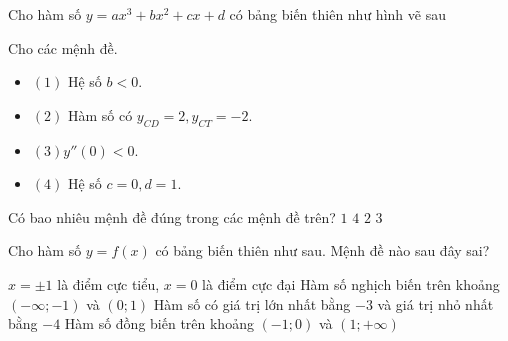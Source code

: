 \begin{ex}%
	Cho hàm số $y=ax^3+bx^2+cx+d$ có bảng biến thiên như hình vẽ sau
	\begin{center}
	\end{center}
	Cho các mệnh đề.
	\begin{itemize}
		\item $(1)$ Hệ số $b<0$.
		\item $(2)$ Hàm số có $y_{CD}=2,y_{CT}=-2$.
		\item $(3) y''(0)<0$.
		\item $(4)$ Hệ số $c=0,d=1$.
	\end{itemize}
	Có bao nhiêu mệnh đề đúng trong các mệnh đề trên?
	\choice
	{$1$}
	{$4$}
	{$2$}
	{\True $3$}
\end{ex}
\begin{ex}%
	Cho hàm số $y=f(x)$ có bảng biến thiên như sau. Mệnh đề nào sau đây sai?
	\begin{center}
	\end{center}
	\choice
	{$x=\pm 1$ là điểm cực tiểu, $x=0$ là điểm cực đại}
	{Hàm số nghịch biến trên khoảng $(-\infty;-1)$ và $(0;1)$}
	{\True Hàm số có giá trị lớn nhất bằng $-3$ và giá trị nhỏ nhất bằng $-4$}
	{Hàm số đồng biến trên khoảng $(-1;0)$ và $(1;+\infty)$}
\end{ex}
